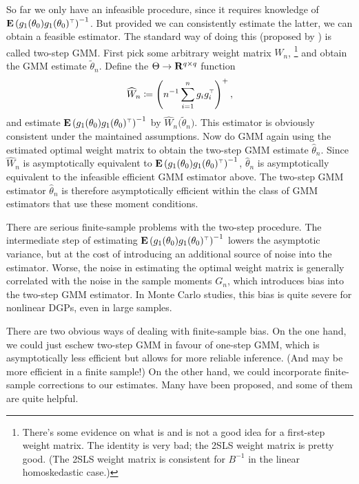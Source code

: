 \documentclass[11pt,letterpaper,reqno,oneside]{article}
\begin{document}
So far we only have an infeasible procedure, since it requires knowledge of $\mathbf{E}\left( g_1(\theta_0) g_1(\theta_0)^{\scriptscriptstyle \top} \right)^{-1}$. But provided we can consistently estimate the latter, we can obtain a feasible estimator. The standard way of doing this (proposed by \textcite{Hansen1982}) is called two-step GMM. First pick some arbitrary weight matrix $W_n$,%
	\footnote{There's some evidence on what is and is not a good idea for a first-step weight matrix. The identity is very bad; the 2SLS weight matrix is pretty good. (The 2SLS weight matrix is consistent for $B^{-1}$ in the linear homoskedastic case.)}
and obtain the GMM estimate $\widetilde{\theta}_n$. Define the $\Theta \to \mathbf{R}^{q \times q}$ function
%
\begin{equation*}
	\widehat{W}_n \coloneqq \left( n^{-1} \sum_{i=1}^n g_i g_i^{\scriptscriptstyle \top} \right)^+ ,
\end{equation*}
%
and estimate $\mathbf{E}\left( g_1(\theta_0) g_1(\theta_0)^{\scriptscriptstyle \top} \right)^{-1}$ by $\widehat{W}_n\bigl( \widetilde{\theta}_n \bigr)$. This estimator is obviously consistent under the maintained assumptions. Now do GMM again using the estimated optimal weight matrix to obtain the two-step GMM estimate $\widehat{\theta}_n$. Since $\widehat{W}_n$ is asymptotically equivalent to $\mathbf{E}\left( g_1(\theta_0) g_1(\theta_0)^{\scriptscriptstyle \top} \right)^{-1}$, $\widehat{\theta}_n$ is asymptotically equivalent to the infeasible efficient GMM estimator above. The two-step GMM estimator $\widehat{\theta}_n$ is therefore asymptotically efficient within the class of GMM estimators that use these moment conditions.

There are serious finite-sample problems with the two-step procedure. The intermediate step of estimating $\mathbf{E}\left( g_1(\theta_0) g_1(\theta_0)^{\scriptscriptstyle \top} \right)^{-1}$ lowers the asymptotic variance, but at the cost of introducing an additional source of noise into the estimator. Worse, the noise in estimating the optimal weight matrix is generally correlated with the noise in the sample moments $G_n$, which introduces bias into the two-step GMM estimator. In Monte Carlo studies, this bias is quite severe for nonlinear DGPs, even in large samples.

There are two obvious ways of dealing with finite-sample bias. On the one hand, we could just eschew two-step GMM in favour of one-step GMM, which is asymptotically less efficient but allows for more reliable inference. (And may be more efficient in a finite sample!) On the other hand, we could incorporate finite-sample corrections to our estimates. Many have been proposed, and some of them are quite helpful.
\end{document}
